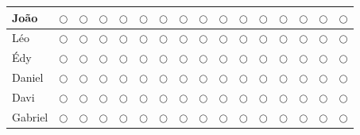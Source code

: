 \documentclass[12pt]{article}
\begin{document}
\begin{center}
\begin{longtable}{ |p{6cm}|c|c|c|c|c|c|c|c|c|c|c|c|c|c|c|}
\hline
João 
&$\bigcirc$
&$\bigcirc$&$\bigcirc$&$\bigcirc$&$\bigcirc$&$\bigcirc$&$\bigcirc$&$\bigcirc$&$\bigcirc$&$\bigcirc$&$\bigcirc$&$\bigcirc$&$\bigcirc$&$\bigcirc$&$\bigcirc$\\
\hline
Léo 
&$\bigcirc$
&$\bigcirc$&$\bigcirc$&$\bigcirc$&$\bigcirc$&$\bigcirc$&$\bigcirc$&$\bigcirc$&$\bigcirc$&$\bigcirc$&$\bigcirc$&$\bigcirc$&$\bigcirc$&$\bigcirc$&$\bigcirc$\\
\hline
Édy 
&$\bigcirc$&$\bigcirc$
&$\bigcirc$&$\bigcirc$&$\bigcirc$&$\bigcirc$&$\bigcirc$&$\bigcirc$&$\bigcirc$&$\bigcirc$&$\bigcirc$&$\bigcirc$&$\bigcirc$&$\bigcirc$&$\bigcirc$\\
\hline
Daniel 
&$\bigcirc$
&$\bigcirc$&$\bigcirc$&$\bigcirc$&$\bigcirc$&$\bigcirc$&$\bigcirc$&$\bigcirc$&$\bigcirc$&$\bigcirc$&$\bigcirc$&$\bigcirc$&$\bigcirc$&$\bigcirc$&$\bigcirc$\\
\hline
Davi 
&$\bigcirc$&$\bigcirc$
&$\bigcirc$&$\bigcirc$&$\bigcirc$&$\bigcirc$&$\bigcirc$&$\bigcirc$&$\bigcirc$&$\bigcirc$&$\bigcirc$&$\bigcirc$&$\bigcirc$&$\bigcirc$&$\bigcirc$\\
\hline
Gabriel 
&$\bigcirc$&$\bigcirc$
&$\bigcirc$&$\bigcirc$&$\bigcirc$&$\bigcirc$&$\bigcirc$&$\bigcirc$&$\bigcirc$&$\bigcirc$&$\bigcirc$&$\bigcirc$&$\bigcirc$&$\bigcirc$&$\bigcirc$\\
\hline


\end{longtable}
\end{center}
\end{document}
